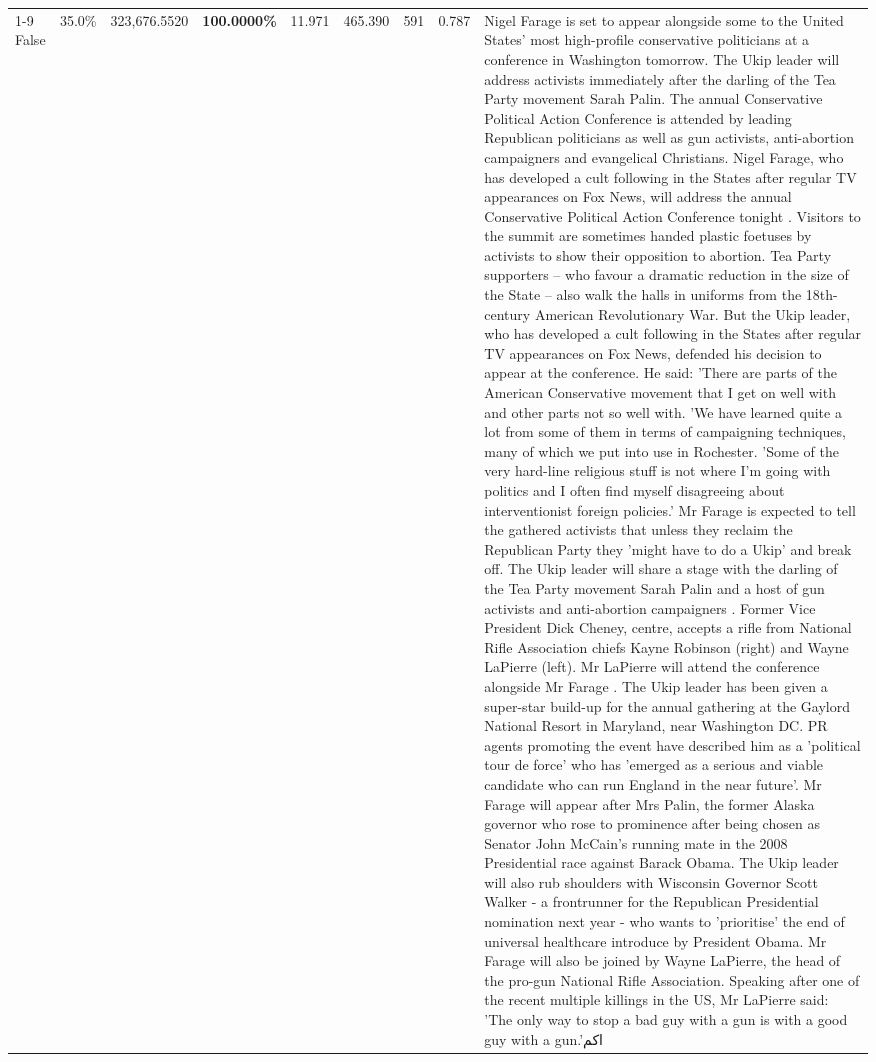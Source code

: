 \begin{table}[H]
\begin{tabular}{lllrlllll}
\cline{1-9}
False & 35.0\% & 323,676.5520 & \bfseries \color{red} 100.0000\% & 11.971 & 465.390 & 591 & 0.787 & Nigel Farage is set to appear alongside some to the United States' most high-profile conservative politicians at a conference in Washington tomorrow. The Ukip leader will address activists immediately after the darling of the Tea Party movement Sarah Palin. The annual Conservative Political Action Conference is attended by leading Republican politicians as well as gun activists, anti-abortion campaigners and evangelical Christians. Nigel Farage, who has developed a cult following in the States after regular TV appearances on Fox News, will address the annual Conservative Political Action Conference tonight . Visitors to the summit are sometimes handed plastic foetuses by activists to show their opposition to abortion. Tea Party supporters – who favour a dramatic reduction in the size of the State – also walk the halls in uniforms from the 18th-century American Revolutionary War. But the Ukip leader, who has developed a cult following in the States after regular TV appearances on Fox News, defended his decision to appear at the conference. He said: 'There are parts of the American Conservative movement that I get on well with and other parts not so well with. 'We have learned quite a lot from some of them in terms of campaigning techniques, many of which we put into use in Rochester. 'Some of the very hard-line religious stuff is not where I'm going with politics and I often find myself disagreeing about interventionist foreign policies.' Mr Farage is expected to tell the gathered activists that unless they reclaim the Republican Party they 'might have to do a Ukip' and break off. The Ukip leader will share a stage with the darling of the Tea Party movement Sarah Palin and a host of gun activists and anti-abortion campaigners . Former Vice President Dick Cheney, centre, accepts a rifle from National Rifle Association chiefs Kayne Robinson (right) and Wayne LaPierre (left). Mr LaPierre will attend the conference alongside Mr Farage . The Ukip leader has been given a super-star build-up for the annual gathering at the Gaylord National Resort in Maryland, near Washington DC. PR agents promoting the event have described him as a 'political tour de force' who has 'emerged as a serious and viable candidate who can run England in the near future'. Mr Farage will appear after Mrs Palin, the former Alaska governor who rose to prominence after being chosen as Senator John McCain's running mate in the 2008 Presidential race against Barack Obama. The Ukip leader will also rub shoulders with Wisconsin Governor Scott Walker - a frontrunner for the Republican Presidential nomination next year - who wants to 'prioritise' the end of universal healthcare introduce by President Obama. Mr Farage will also be joined by Wayne LaPierre, the head of the pro-gun National Rifle Association. Speaking after one of the recent multiple killings in the US, Mr LaPierre said: 'The only way to stop a bad guy with a gun is with a good guy with a gun.'اكم \\

\end{tabular}
\end{table}
